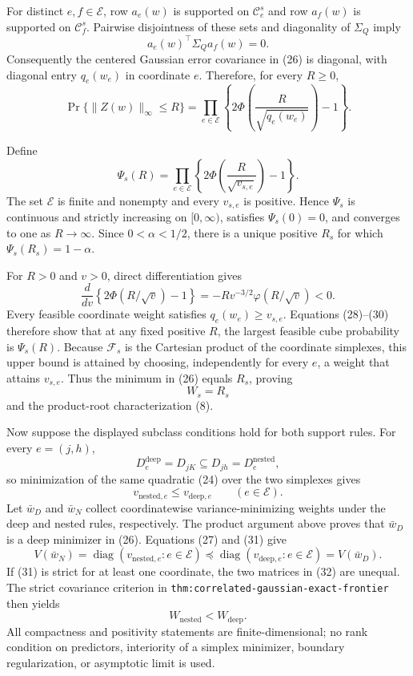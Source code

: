 For distinct \(e,f\in\mathcal E\), row \(a_e(w)\) is supported on
\(\mathcal C^s_e\) and row \(a_f(w)\) is supported on
\(\mathcal C^s_f\).  Pairwise disjointness of these sets and diagonality of
\(\Sigma_Q\) imply
\[
 a_e(w)^{\top}\Sigma_Qa_f(w)=0. \tag{27}
\]
Consequently the centered Gaussian error covariance in (26) is diagonal,
with diagonal entry \(q_e(w_e)\) in coordinate \(e\).  Therefore, for every
\(R\geq0\),
\[
 \Pr\{\lVert Z(w)\rVert_\infty\leq R\}
 =\prod_{e\in\mathcal E}
 \left\{2\Phi\!\left(\frac{R}{\sqrt{q_e(w_e)}}\right)-1\right\}. \tag{28}
\]

Define
\[
 \Psi_s(R)=\prod_{e\in\mathcal E}
 \left\{2\Phi\!\left(\frac{R}{\sqrt{v_{s,e}}}\right)-1\right\}.
 \tag{29}
\]
The set \(\mathcal E\) is finite and nonempty and every \(v_{s,e}\) is
positive.  Hence \(\Psi_s\) is continuous and strictly increasing on
\([0,\infty)\), satisfies \(\Psi_s(0)=0\), and converges to one as
\(R\to\infty\).  Since \(0<\alpha<1/2\), there is a unique positive
\(R_s\) for which \(\Psi_s(R_s)=1-\alpha\).

For \(R>0\) and \(v>0\), direct differentiation gives
\[
 \frac{d}{dv}\left\{2\Phi(R/\sqrt v)-1\right\}
 =-Rv^{-3/2}\varphi(R/\sqrt v)<0. \tag{30}
\]
Every feasible coordinate weight satisfies \(q_e(w_e)\geq v_{s,e}\).
Equations (28)--(30) therefore show that at any fixed positive \(R\), the
largest feasible cube probability is \(\Psi_s(R)\).  Because
\(\mathcal F_s\) is the Cartesian product of the coordinate simplexes, this
upper bound is attained by choosing, independently for every \(e\), a weight
that attains \(v_{s,e}\).  Thus the minimum in (26) equals \(R_s\), proving
\[
 W_s=R_s
\]
and the product-root characterization (8).

Now suppose the displayed subclass conditions hold for both support rules.
For every \(e=(j,h)\),
\[
 D^{\mathrm{deep}}_e=D_{jK}\subseteq D_{jh}
 =D^{\mathrm{nested}}_e,
\]
so minimization of the same quadratic (24) over the two simplexes gives
\[
 v_{\mathrm{nested},e}\leq v_{\mathrm{deep},e}
 \qquad(e\in\mathcal E). \tag{31}
\]
Let \(\bar w_D\) and \(\bar w_N\) collect coordinatewise
variance-minimizing weights under the deep and nested rules, respectively.
The product argument above proves that \(\bar w_D\) is a deep minimizer in
(26).  Equations (27) and (31) give
\[
 V(\bar w_N)=\operatorname{diag}
   (v_{\mathrm{nested},e}:e\in\mathcal E)
 \preceq
 \operatorname{diag}
   (v_{\mathrm{deep},e}:e\in\mathcal E)
 =V(\bar w_D). \tag{32}
\]
If (31) is strict for at least one coordinate, the two matrices in (32) are
unequal.  The strict covariance criterion in
\texttt{thm:correlated-gaussian-exact-frontier} then yields
\[
 W_{\mathrm{nested}}<W_{\mathrm{deep}}. \tag{33}
\]
All compactness and positivity statements are finite-dimensional; no rank
condition on predictors, interiority of a simplex minimizer, boundary
regularization, or asymptotic limit is used.
